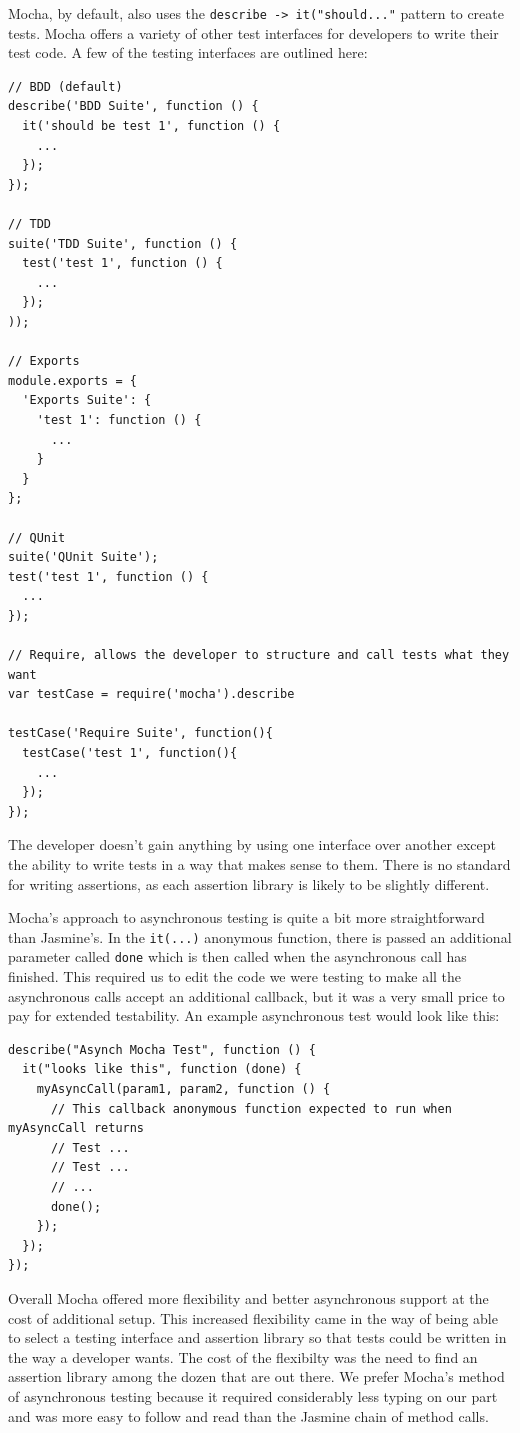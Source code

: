 \documentclass[12pt]{ucthesis}
\begin{document}
Mocha, by default, also uses the \lstinline{describe -> it("should..."} pattern to create tests. Mocha offers a variety of other test interfaces for developers to write their test code. A few of the testing interfaces are outlined here:
\begin{lstlisting}
// BDD (default)
describe('BDD Suite', function () {
  it('should be test 1', function () {
    ...
  });
});

// TDD
suite('TDD Suite', function () {
  test('test 1', function () {
    ...
  });
));

// Exports
module.exports = {
  'Exports Suite': {
    'test 1': function () {
      ...
    }
  }
};

// QUnit
suite('QUnit Suite');
test('test 1', function () {
  ...
});

// Require, allows the developer to structure and call tests what they want
var testCase = require('mocha').describe

testCase('Require Suite', function(){
  testCase('test 1', function(){
    ...
  });
});
\end{lstlisting}
The developer doesn't gain anything by using one interface over another except the ability to write tests in a way that makes sense to them. There is no standard for writing assertions, as each assertion library is likely to be slightly different.

Mocha's approach to asynchronous testing is quite a bit more straightforward than Jasmine's. In the \lstinline{it(...)} anonymous function, there is passed an additional parameter called \lstinline{done} which is then called when the asynchronous call has finished. This required us to edit the code we were testing to make all the asynchronous calls accept an additional callback, but it was a very small price to pay for extended testability. An example asynchronous test would look like this:
\begin{lstlisting}
describe("Asynch Mocha Test", function () {
  it("looks like this", function (done) {
    myAsyncCall(param1, param2, function () { 
      // This callback anonymous function expected to run when myAsyncCall returns
      // Test ...
      // Test ...
      // ...
      done();
    });
  });
});
\end{lstlisting}

Overall Mocha offered more flexibility and better asynchronous support at the cost of additional setup. This increased flexibility came in the way of being able to select a testing interface and assertion library so that tests could be written in the way a developer wants. The cost of the flexibilty was the need to find an assertion library among the dozen that are out there. We prefer Mocha's method of asynchronous testing because it required considerably less typing on our part and was more easy to follow and read than the Jasmine chain of method calls.
\end{document}
